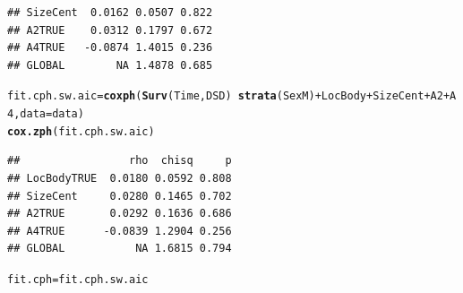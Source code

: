 \documentclass{article}\usepackage[]{graphicx}\usepackage[]{color}
\makeatletter
\newcommand{\hlopt}[1]{\textcolor[rgb]{0,0,0}{#1}}%
\newcommand{\hlstd}[1]{\textcolor[rgb]{0.345,0.345,0.345}{#1}}%
\newcommand{\hlkwb}[1]{\textcolor[rgb]{0.69,0.353,0.396}{#1}}%
\newcommand{\hlkwc}[1]{\textcolor[rgb]{0.333,0.667,0.333}{#1}}%
\newcommand{\hlkwd}[1]{\textcolor[rgb]{0.737,0.353,0.396}{\textbf{#1}}}%
\newenvironment{kframe}{%
 \def\at@end@of@kframe{}%
 \ifinner\ifhmode%
  \def\at@end@of@kframe{\end{minipage}}%
  \begin{minipage}{\columnwidth}%
 \fi\fi%
 \def\FrameCommand##1{\hskip\@totalleftmargin \hskip-\fboxsep
 \colorbox{shadecolor}{##1}\hskip-\fboxsep
     \hskip-\linewidth \hskip-\@totalleftmargin \hskip\columnwidth}%
 \MakeFramed {\advance\hsize-\width
   \@totalleftmargin\z@ \linewidth\hsize
   \@setminipage}}%
 {\par\unskip\endMakeFramed%
 \at@end@of@kframe}
\newenvironment{knitrout}{}{} %
\makeatother
\begin{document}
\begin{knitrout}
\begin{kframe}
\begin{verbatim}
## SizeCent  0.0162 0.0507 0.822
## A2TRUE    0.0312 0.1797 0.672
## A4TRUE   -0.0874 1.4015 0.236
## GLOBAL        NA 1.4878 0.685
\end{verbatim}
\begin{alltt}
\hlstd{fit.cph.sw.aic} \hlkwb{=} \hlkwd{coxph}\hlstd{(}\hlkwd{Surv}\hlstd{(Time, DSD)} \hlopt{~} \hlkwd{strata}\hlstd{(SexM)} \hlopt{+} \hlstd{LocBody} \hlopt{+} \hlstd{SizeCent} \hlopt{+} \hlstd{A2} \hlopt{+} \hlstd{A4,} \hlkwc{data} \hlstd{= data)}
\hlkwd{cox.zph}\hlstd{(fit.cph.sw.aic)}
\end{alltt}
\begin{verbatim}
##                 rho  chisq     p
## LocBodyTRUE  0.0180 0.0592 0.808
## SizeCent     0.0280 0.1465 0.702
## A2TRUE       0.0292 0.1636 0.686
## A4TRUE      -0.0839 1.2904 0.256
## GLOBAL           NA 1.6815 0.794
\end{verbatim}
\begin{alltt}
\hlstd{fit.cph} \hlkwb{=} \hlstd{fit.cph.sw.aic}
\end{alltt}
\end{kframe}
\end{knitrout}
\end{document}
